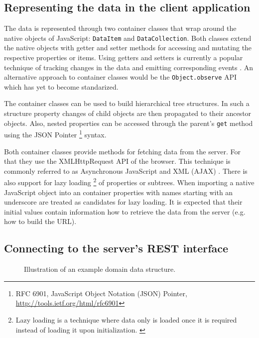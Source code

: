 \subsection{Representing the data in the client application}

The data is represented through two container classes that wrap around the native objects of JavaScript: \texttt{DataItem} and \texttt{DataCollection}. Both classes extend the native objects with getter and setter methods for accessing and mutating the respective properties or items. Using getters and setters is currently a popular technique of tracking changes in the data and emitting corresponding events . An alternative approach to container classes would be the \texttt{Object.observe} API \cite{Waldron_2012} which has yet to become standarized.

The container classes can be used to build hierarchical tree structures. In such a structure property changes of child objects are then propagated to their ancestor objects. Also, nested properties can be accessed through the parent's \texttt{get} method using the JSON Pointer \footnote{RFC 6901, JavaScript Object Notation (JSON) Pointer, \url{http://tools.ietf.org/html/rfc6901}} syntax.

Both container classes provide methods for fetching data from the server. For that they use the XMLHttpRequest \cite{W3C_XHR} API of the browser. This technique is commonly referred to as Asynchronous JavaScript and XML (AJAX) \cite{Garrett_2005}. There is also support for lazy loading \footnote{Lazy loading is a technique where data only is loaded once it is required instead of loading it upon initialization. \cite{Fowler_2002}} of properties or subtrees. When importing a native JavaScript object into an container properties with names starting with an underscore are treated as candidates for lazy loading. It is expected that their initial values contain information how to retrieve the data from the server (e.g. how to build the URL).

\subsection{Connecting to the server's REST interface}

\begin{figure}
\caption{Illustration of an example domain data structure.}
\label{fig:projectstruc}
\end{figure}

